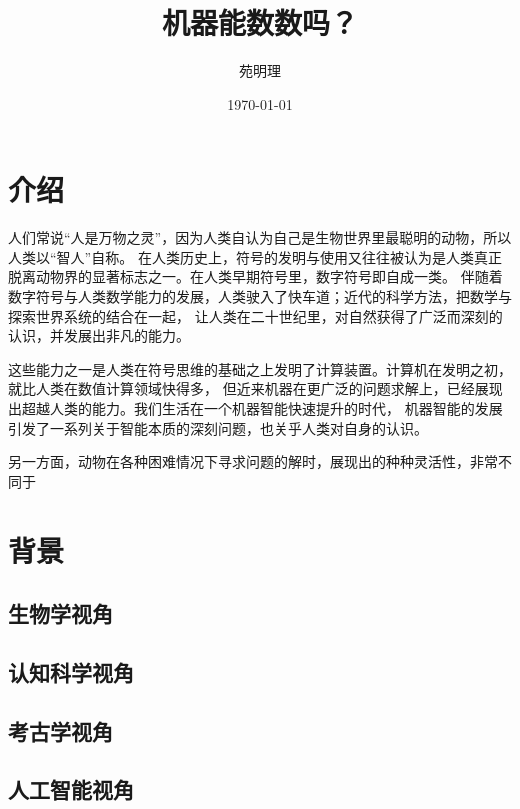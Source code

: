 \documentclass[a4paper,12pt]{article}
\title{机器能数数吗？}
\author{苑明理}
\date{\monthyeardate\today}
\begin{document}
\begingroup
\let\newpage\relax
\maketitle
\endgroup

\renewcommand\contentsname{目录}
\setcounter{tocdepth}{2}
\tableofcontents

\newpage

\section{介绍}

人们常说“人是万物之灵”，因为人类自认为自己是生物世界里最聪明的动物，所以人类以“智人”自称。
在人类历史上，符号的发明与使用又往往被认为是人类真正脱离动物界的显著标志之一。在人类早期符号里，数字符号即自成一类。
伴随着数字符号与人类数学能力的发展，人类驶入了快车道；近代的科学方法，把数学与探索世界系统的结合在一起，
让人类在二十世纪里，对自然获得了广泛而深刻的认识，并发展出非凡的能力。

这些能力之一是人类在符号思维的基础之上发明了计算装置。计算机在发明之初，就比人类在数值计算领域快得多，
但近来机器在更广泛的问题求解上，已经展现出超越人类的能力。我们生活在一个机器智能快速提升的时代，
机器智能的发展引发了一系列关于智能本质的深刻问题，也关乎人类对自身的认识。

另一方面，动物在各种困难情况下寻求问题的解时，展现出的种种灵活性，非常不同于

\section{背景}

\subsection{生物学视角}

\subsection{认知科学视角}

\subsection{考古学视角}

\subsection{人工智能视角}
\end{document}
